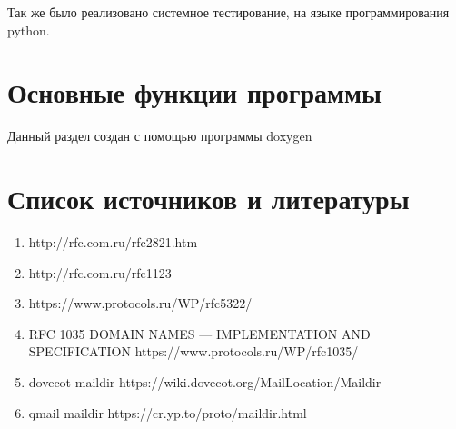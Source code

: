 \documentclass[a4paper,12pt]{report}
\begin{document}
		Так же было реализовано системное тестирование, на языке программирования python.

\section{Основные функции программы}

Данный раздел  создан с помощью программы doxygen



   



	

	\section{Список источников и литературы}
	\begin{enumerate}
		\item http://rfc.com.ru/rfc2821.htm
		\item http://rfc.com.ru/rfc1123
		\item https://www.protocols.ru/WP/rfc5322/
		\item RFC 1035 DOMAIN NAMES — IMPLEMENTATION AND SPECIFICATION  https://www.protocols.ru/WP/rfc1035/
		\item dovecot maildir https://wiki.dovecot.org/MailLocation/Maildir
		\item qmail maildir https://cr.yp.to/proto/maildir.html
	\end{enumerate}
	
	\newpage
\end{document}

